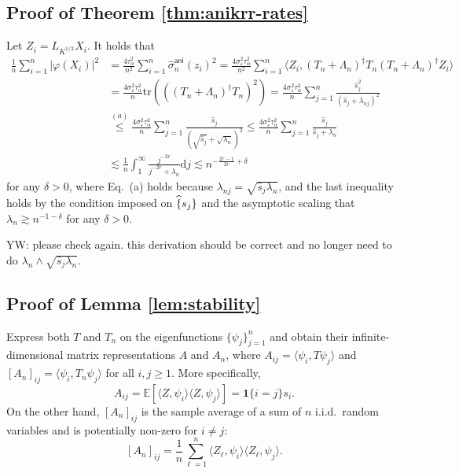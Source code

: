 \documentclass[11pt,a4paper]{article}
\renewcommand{\hat}{\widehat}
\newcommand{\vct}{\boldsymbol}
\newcommand{\tr}{\mathrm{tr}}
\theoremstyle{definition}
\theoremstyle{plain}
\theoremstyle{remark}
\newcommand{\ud}{\mathrm d}
\newcommand{\ani}{\mathsf{ani}}
\begin{document}
\subsection{Proof of Theorem \ref{thm:anikrr-rates}}

Let $Z_i=L_{K^{1/2}}X_i$.
It holds that
\begin{align*}
\frac{1}{n}\sum_{i=1}^n\big|\varphi(X_i)\big|^2 &= \frac{4\tau_\alpha^2}{n^2}\sum_{i=1}^n\hat\sigma_n^\ani(z_i)^2 = \frac{4\sigma_\varepsilon^2\tau_\alpha^2}{n^2}\sum_{i=1}^n \langle Z_i, (T_n+\Lambda_n)^{\dagger}T_n(T_n+\Lambda_n)^{\dagger}Z_i\rangle\\
&= \frac{4\sigma_\varepsilon^2\tau_\alpha^2}{n}\tr(((T_n+\Lambda_n)^{\dagger}T_n)^2) = \frac{4\sigma_\varepsilon^2\tau_\alpha^2}{n}\sum_{j=1}^n\frac{\hat s_j^2}{(\hat s_j+\lambda_{nj})^2}\\
& \overset{(a)}{\leq} \frac{4\sigma_\varepsilon^2\tau_\alpha^2}{n}\sum_{j=1}^n\frac{\hat s_j}{(\sqrt{\hat s_j}+\sqrt{\lambda_n})^2} \leq \frac{4\sigma_\varepsilon^2\tau_\alpha^2}{n}\sum_{j=1}^n\frac{\hat s_j}{{\hat s_j}+{\lambda_n}} \\
&\lesssim \frac{1}{n}\int_1^{\infty} \frac{j^{-2r}}{j^{-2r}+\lambda_n}\ud j \lesssim n^{-\frac{2r-1}{2r}+\delta}
\end{align*}
for any $\delta>0$, where Eq.~(a) holds because $\lambda_{nj}= \sqrt{\hat s_j\lambda_n}$, and
the last inequality holds by the condition imposed on $\hat\{s_j\}$ and the asymptotic scaling that $\lambda_n\gtrsim n^{-1-\delta}$ for any $\delta>0$.

{\color{red} YW: please check again. this derivation should be correct and no longer need to do $\lambda_n\wedge\sqrt{\hat s_j\lambda_n}$.}




\subsection{Proof of Lemma \ref{lem:stability}}

Express both $T$ and $T_n$ on the eigenfunctions $\{\psi_j\}_{j=1}^n$ and obtain their infinite-dimensional matrix representations $A$ and $A_n$,
where $A_{ij}=\langle \psi_i,T\psi_j\rangle$ and $[A_n]_{ij}=\langle\psi_i, T_n\psi_j\rangle$ for all $i,j\geq 1$.
More specifically,
$$
A_{ij} = \mathbb E[\langle Z,\psi_i\rangle\langle Z,\psi_j\rangle] = \vct 1\{i=j\}s_i.
$$
On the other hand, $[A_n]_{ij}$ is the sample average of a sum of $n$ i.i.d.~random variables and is potentially non-zero for $i\neq j$:
$$
[A_n]_{ij} = \frac{1}{n}\sum_{\ell=1}^n \langle Z_\ell,\psi_i\rangle\langle Z_\ell,\psi_j\rangle.
$$
\end{document}
